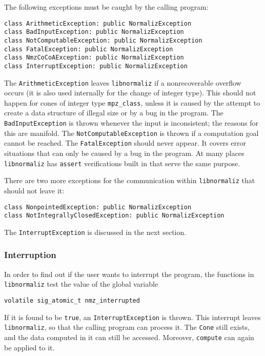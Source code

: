 \documentclass[12pt,a4paper]{scrartcl}
\theoremstyle{definition}
\begin{document}
\begin{small}
The following exceptions must be caught by the calling program:
\begin{Verbatim}
class ArithmeticException: public NormalizException
class BadInputException: public NormalizException
class NotComputableException: public NormalizException
class FatalException: public NormalizException
class NmzCoCoAException: public NormalizException
class InterruptException: public NormalizException
\end{Verbatim}

The \verb|ArithmeticException| leaves \verb|libnormaliz| if a nonrecoverable overflow occurs (it is also used internally for the change of integer type). This should not happen for cones of integer type \verb|mpz_class|, unless it is caused by the attempt to create a data structure of illegal size or by a bug in the program. The \verb|BadInputException| is thrown whenever the input is inconsistent; the reasons for this are manifold. The \verb|NotComputableException| is thrown if a computation goal cannot be reached. The \verb|FatalException| should never appear. It covers error situations that can only be caused by a bug in the program. At many places \verb|libnormaliz| has \verb|assert| verifications built in that serve the same purpose. 

There are two more exceptions for the communication within \verb|libnormaliz| that should not leave it:
\begin{Verbatim}
class NonpointedException: public NormalizException 
class NotIntegrallyClosedException: public NormalizException
\end{Verbatim}

The \verb|InterruptException| is discussed in the next section.

\subsubsection{Interruption}

In order to find out if the user wants to interrupt the program, the functions in \verb|libnormaliz| test the value of the global variable
\begin{Verbatim}
volatile sig_atomic_t nmz_interrupted
\end{Verbatim}
If it is found to be \verb|true|, an \verb|InterruptException| is thrown. This interrupt leaves \verb|libnormaliz|, so that the calling program can process it. The \verb|Cone| still exists, and the data computed in it can still be accessed. Moreover, \verb|compute| can again be applied to it.


\end{small}
\end{document}
